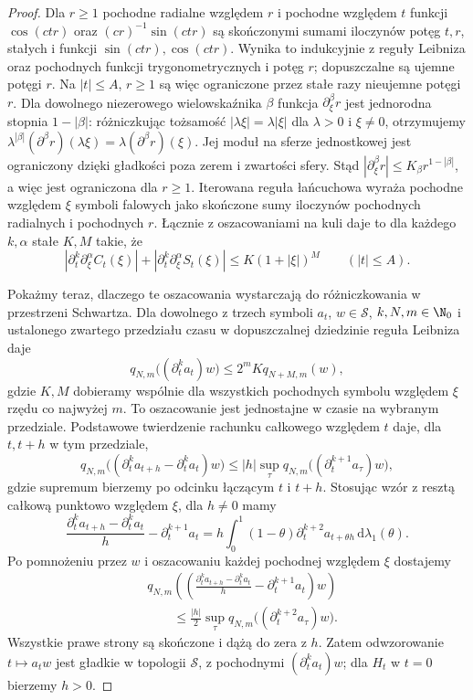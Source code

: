 \begin{proof}
Dla $r\ge1$ pochodne radialne względem $r$
i pochodne względem $t$ funkcji
$\cos(ctr)$ oraz $(cr)^{-1}\sin(ctr)$
są skończonymi sumami iloczynów potęg $t,r$,
stałych i funkcji $\sin(ctr),\cos(ctr)$.
Wynika to indukcyjnie z reguły Leibniza
oraz pochodnych funkcji trygonometrycznych
i potęg $r$; dopuszczalne są ujemne potęgi $r$.
Na $|t|\le A$, $r\ge1$ są więc ograniczone
przez stałe razy nieujemne potęgi $r$.
Dla dowolnego niezerowego wielowskaźnika $\beta$
funkcja $\partial_\xi^\beta r$ jest jednorodna
stopnia $1-|\beta|$: różniczkując tożsamość
$|\lambda\xi|=\lambda|\xi|$ dla $\lambda>0$
i $\xi\ne0$, otrzymujemy
$\lambda^{|\beta|}(\partial^\beta r)(\lambda\xi)
=\lambda(\partial^\beta r)(\xi)$. Jej moduł na sferze jednostkowej
jest ograniczony dzięki gładkości poza zerem
i zwartości sfery. Stąd
$|\partial_\xi^\beta r|\le K_\beta r^{1-|\beta|}$,
a więc jest ograniczona dla $r\ge1$.
Iterowana reguła łańcuchowa wyraża pochodne
względem $\xi$ symboli falowych jako skończone
sumy iloczynów pochodnych radialnych i pochodnych $r$.
Łącznie z oszacowaniami na kuli daje to dla
każdego $k,\alpha$ stałe $K,M$ takie, że
\[
 |\partial_t^k\partial_\xi^\alpha C_t(\xi)|
 +|\partial_t^k\partial_\xi^\alpha S_t(\xi)|
 \le K(1+|\xi|)^M\qquad (|t|\le A).
\]

Pokażmy teraz, dlaczego te oszacowania
wystarczają do różniczkowania w przestrzeni Schwartza.
Dla dowolnego z trzech symboli $a_t$,
$w\in\mathcal S$, $k,N,m\in\N_0$ i ustalonego
zwartego przedziału czasu w dopuszczalnej dziedzinie
reguła Leibniza daje
\[
 q_{N,m}\bigl((\partial_t^k a_t)w\bigr)
 \le 2^m K q_{N+M,m}(w),
\]
gdzie $K,M$ dobieramy wspólnie dla wszystkich
pochodnych symbolu względem $\xi$ rzędu
co najwyżej $m$. To oszacowanie jest jednostajne
w czasie na wybranym przedziale.
Podstawowe twierdzenie rachunku całkowego
względem $t$ daje, dla $t,t+h$ w tym przedziale,
\[
 q_{N,m}\bigl((\partial_t^k a_{t+h}
             -\partial_t^k a_t)w\bigr)
 \le |h|\sup_\tau q_{N,m}\bigl((\partial_t^{k+1}a_\tau)w\bigr),
\]
gdzie supremum bierzemy po odcinku łączącym $t$ i $t+h$.
Stosując wzór z resztą całkową punktowo
względem $\xi$, dla $h\ne0$ mamy
\[
 \frac{\partial_t^k a_{t+h}-\partial_t^k a_t}{h}
 -\partial_t^{k+1}a_t
 =h\int_0^1(1-\theta)\partial_t^{k+2}a_{t+\theta h}
 \,\mathrm d\lambda_1(\theta).
\]
Po pomnożeniu przez $w$ i oszacowaniu
każdej pochodnej względem $\xi$ dostajemy
\[
 \begin{aligned}
 &q_{N,m}\left(
 \left(\frac{\partial_t^k a_{t+h}-\partial_t^k a_t}{h}
 -\partial_t^{k+1}a_t\right)w\right)\\
 &\qquad\le\frac{|h|}{2}\sup_\tau
 q_{N,m}\bigl((\partial_t^{k+2}a_\tau)w\bigr).
 \end{aligned}
\]
Wszystkie prawe strony są skończone
i dążą do zera z $h$.
Zatem odwzorowanie $t\mapsto a_tw$
jest gładkie w topologii $\mathcal S$,
z pochodnymi $(\partial_t^k a_t)w$;
dla $H_t$ w $t=0$ bierzemy $h>0$.


\end{proof}

